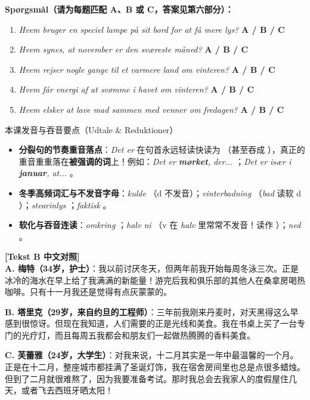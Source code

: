 \textbf{Spørgsmål（请为每题匹配 A、B 或 C，答案见第六部分）：}
\begin{enumerate}
  \item \textit{Hvem bruger en speciel lampe på sit bord for at få mere lys?} \quad \textbf{A / B / C}
  \item \textit{Hvem synes, at november er den sværeste måned?} \quad \textbf{A / B / C}
  \item \textit{Hvem rejser nogle gange til et varmere land om vinteren?} \quad \textbf{A / B / C}
  \item \textit{Hvem får energi af at svømme i havet om vinteren?} \quad \textbf{A / B / C}
  \item \textit{Hvem elsker at lave mad sammen med venner om fredagen?} \quad \textbf{A / B / C}
\end{enumerate}

\begin{tipbox}{本课发音与吞音要点（Udtale \& Reduktioner）}
\begin{itemize}
  \item \textbf{分裂句的节奏重音落点}：\textit{Det er} 在句首永远轻读快读为 （甚至吞成 ），真正的重音重重落在\textbf{被强调的词}上！例如：\textit{Det er \textbf{mørket}, der...} ；\textit{Det er især i \textbf{januar}, at...} 。
  \item \textbf{冬季高频词汇与不发音字母}：\textit{kulde} （d 不发音）；\textit{vinterbadning} （\textit{bad} 读软 d ）；\textit{stearinlys} ；\textit{faktisk} 。
  \item \textbf{软化与吞音连读}：\textit{omkring} ；\textit{halv ni} （v 在 \textit{halv} 里常常不发音！读作 ）；\textit{ned} 。
\end{itemize}
\end{tipbox}

\begin{transbox}
\small
\textbf{\color{NCDTeal}[Tekst B 中文对照]}\\
\textbf{A. 梅特（34岁，护士）}：我以前讨厌冬天，但两年前我开始每周冬泳三次。正是冰冷的海水在早上给了我满满的新能量！游完后我和俱乐部的其他人在桑拿房喝热咖啡。只有十一月我还是觉得有点灰蒙蒙的。

\textbf{B. 塔里克（29岁，来自约旦的工程师）}：三年前我刚来丹麦时，对天黑得这么早感到很惊讶。但现在我知道，人们需要的正是光线和美食。我在书桌上买了一台专门的光疗灯，而且每周五我都会和朋友们一起做热腾腾的香料美食。

\textbf{C. 芙蕾雅（24岁，大学生）}：对我来说，十二月其实是一年中最温馨的一个月。正是在十二月，整座城市都挂满了圣诞灯饰，我在宿舍房间里也总是点很多蜡烛。但到了二月就很难熬了，因为我要准备考试。那时我总会去我家人的度假屋住几天，或者飞去西班牙晒太阳！
\end{transbox}

